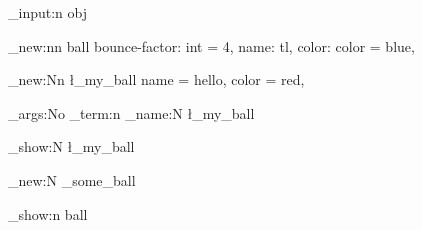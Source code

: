 \nonstopmode  \relax \ExplSyntaxOn %


\file_input:n { obj }

\obj_new:nn { ball }
  {
    bounce-factor: int = 4,
    name: tl,
    color: color = blue,
  }

\ball_new:Nn \l_my_ball
  {
    name = hello,
    color = red,
  }

\exp_args:No \msg_term:n { \ball_name:N \l_my_ball }

\ball_show:N \l_my_ball


\ball_new:N \g_some_ball

\obj_show:n { ball }

\bye
